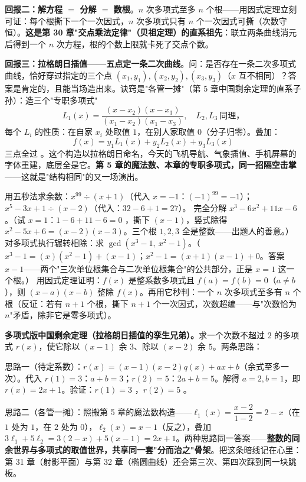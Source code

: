 \textbf{回报二：解方程 $=$ 分解 $=$ 数根}。$n$ 次多项式至多 $n$ 个根——用因式定理立刻可证：每个根撕下一个一次因式，$n$ 次多项式只有 $n$ 个一次因式可撕（次数守恒）。\textbf{这是第 30 章"交点乘法定律"（贝祖定理）的直系祖先}：联立两条曲线消元后得到一个 $n$ 次方程，根的个数上限就卡死了交点个数。

\textbf{回报三：拉格朗日插值——五点定一条二次曲线}。问：是否存在一条二次多项式曲线，恰好穿过指定的三个点 $(x_1,y_1), (x_2,y_2), (x_3,y_3)$（$x$ 互不相同）？答案是肯定的，且能当场造出来。诀窍是"各管一摊"（第 5 章中国剩余定理的直系子孙）：造三个"专职多项式"
\[
L_1(x) = \frac{(x-x_2)(x-x_3)}{(x_1-x_2)(x_1-x_3)}, \quad L_2, L_3\ \text{同理}，
\]
每个 $L_i$ 的性质：在自家 $x_i$ 处取值 $1$，在别人家取值 $0$（分子归零）。叠加：
\[
f(x) = y_1 L_1(x) + y_2 L_2(x) + y_3 L_3(x)
\]
三点全过 \checkmark。这个构造以拉格朗日命名，今天的飞机导航、气象插值、手机屏幕的字体重建，底层全是它。\textbf{第 5 章的魔法数、本章的专职多项式，同一招隔空击掌}——这就是"结构相同"的又一场演出。

\begin{dongshou}
\begin{itemize}
  \yisi 用五秒法求余数：$x^{99} \div (x+1)$（代入 $x=-1$：$(-1)^{99} = -1$）；$x^5 - 3x + 1 \div (x-2)$（代入：$32 - 6 + 1 = 27$）。
  \yier 完全分解 $x^3 - 6x^2 + 11x - 6$。（试 $x = 1$：$1 - 6 + 11 - 6 = 0$ \checkmark，撕下 $(x-1)$，竖式除得 $x^2 - 5x + 6 = (x-2)(x-3)$。三个根 $1, 2, 3$ 全是整数——出题人的善意。）
  \yier 对多项式执行辗转相除：求 $\gcd(x^3 - 1,\ x^2 - 1)$。（$x^3 - 1 = (x)(x^2-1) + (x - 1)$；$x^2 - 1 = (x+1)(x-1) + 0$。答案 $x - 1$——两个"三次单位根集合与二次单位根集合"的公共部分，正是 $x=1$ 这一个根。）
  \yier 用因式定理证明：$f(x)$ 是整系数多项式且 $f(a) = f(b) = 0$（$a \ne b$），则 $(x-a)(x-b)$ 整除 $f(x)$。再用它秒判：一个 $n$ 次多项式至多有 $n$ 个根（反证：若有 $n+1$ 个根，撕下 $n+1$ 个一次因式，次数超编——与"次数恰为 $n$"矛盾，除非它是零多项式）。
\end{itemize}
\end{dongshou}

\begin{shaonao}
\textbf{多项式版中国剩余定理（拉格朗日插值的孪生兄弟）。}求一个次数不超过 $2$ 的多项式 $r(x)$，使它除以 $(x-1)$ 余 $3$、除以 $(x-2)$ 余 $5$。两条思路：

思路一（待定系数）：$r(x) = (x-1)(x-2)q(x) + ax + b$（余式至多一次）。代入 $r(1) = 3$：$a + b = 3$；$r(2) = 5$：$2a + b = 5$。解得 $a = 2, b = 1$，即 $r(x) = 2x + 1$。验证：$r(1) = 3$ \checkmark，$r(2) = 5$ \checkmark。

思路二（各管一摊）：照搬第 5 章的魔法数构造——$\ell_1(x) = \dfrac{x-2}{1-2} = 2 - x$（在 $1$ 处为 $1$，在 $2$ 处为 $0$），$\ell_2(x) = x - 1$（反之），叠加 $3\ell_1 + 5\ell_2 = 3(2-x) + 5(x-1) = 2x + 1$。两种思路同一答案——\textbf{整数的同余世界与多项式的取值世界，共享同一套"分而治之"骨架}。把这条暗线记在心里：第 31 章（射影平面）与第 32 章（椭圆曲线）还会第三次、第四次踩到同一块跳板。
\end{shaonao}

